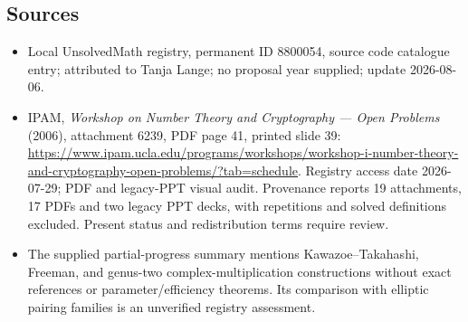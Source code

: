 \documentclass[11pt]{article}
\begin{document}
\subsection{Sources}
\begin{itemize}
\item Local UnsolvedMath registry, permanent ID 8800054, source code catalogue entry; attributed to Tanja Lange; no proposal year supplied; update 2026-08-06.
\item IPAM, \emph{Workshop on Number Theory and Cryptography --- Open Problems} (2006), attachment 6239, PDF page 41, printed slide 39: \url{https://www.ipam.ucla.edu/programs/workshops/workshop-i-number-theory-and-cryptography-open-problems/?tab=schedule}. Registry access date 2026-07-29; PDF and legacy-PPT visual audit. Provenance reports 19 attachments, 17 PDFs and two legacy PPT decks, with repetitions and solved definitions excluded. Present status and redistribution terms require review.
\item The supplied partial-progress summary mentions Kawazoe--Takahashi, Freeman, and genus-two complex-multiplication constructions without exact references or parameter/efficiency theorems. Its comparison with elliptic pairing families is an unverified registry assessment.
\end{itemize}
\end{document}
